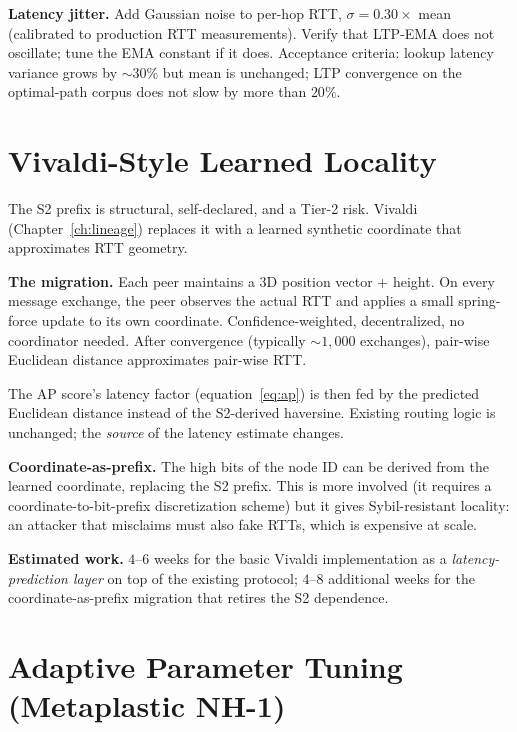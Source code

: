 \documentclass[twoside,nobib]{tufte-book}
\begin{document}
\textbf{Latency jitter.} Add Gaussian noise to per-hop RTT,
$\sigma = 0.30 \times$ mean (calibrated to production RTT
measurements). Verify that LTP-EMA does not oscillate; tune
the EMA constant if it does. Acceptance criteria: lookup
latency variance grows by $\sim 30\%$ but mean is unchanged;
LTP convergence on the optimal-path corpus does not slow by
more than $20\%$.

\section{Vivaldi-Style Learned Locality}

The S2 prefix is structural, self-declared, and a Tier-2 risk.
Vivaldi (Chapter~\ref{ch:lineage}) replaces it with a learned
synthetic coordinate that approximates RTT geometry.

\textbf{The migration.} Each peer maintains a $3$D position
vector + height. On every message exchange, the peer observes
the actual RTT and applies a small spring-force update to its
own coordinate. Confidence-weighted, decentralized, no
coordinator needed. After convergence (typically $\sim 1{,}000$
exchanges), pair-wise Euclidean distance approximates pair-wise
RTT.

The AP score's latency factor (equation~\ref{eq:ap}) is then
fed by the predicted Euclidean distance instead of the
S2-derived haversine. Existing routing logic is unchanged; the
\emph{source} of the latency estimate changes.

\textbf{Coordinate-as-prefix.} The high bits of the node ID can
be derived from the learned coordinate, replacing the S2 prefix.
This is more involved (it requires a coordinate-to-bit-prefix
discretization scheme) but it gives Sybil-resistant locality:
an attacker that misclaims must also fake RTTs, which is
expensive at scale.

\textbf{Estimated work.} $4$--$6$ weeks for the basic Vivaldi
implementation as a \emph{latency-prediction layer} on top of
the existing protocol; $4$--$8$ additional weeks for the
coordinate-as-prefix migration that retires the S2 dependence.

\section{Adaptive Parameter Tuning (Metaplastic NH-1)}
\end{document}
